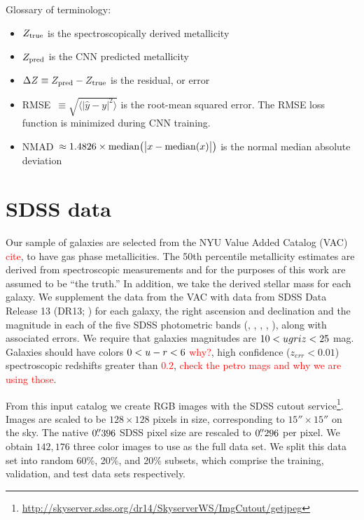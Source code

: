 \documentclass[fleqn,usenatbib]{mnras}
\newcommand{\editorial}[1]{\textcolor{red}{#1}}
\begin{document}
Glossary of terminology:
\begin{itemize}
	\item $Z_{\rm true}$ is the spectroscopically derived metallicity
	\item $Z_{\rm pred}$ is the CNN predicted metallicity
	\item $\Delta Z \equiv Z_{\rm pred} - Z_{\rm true}$ is the residual, or error
	\item RMSE~$\equiv \sqrt{\langle |\hat y - y|^2\rangle}$ is the root-mean squared error. 
	The RMSE loss function is minimized during CNN training.
	\item NMAD~$\approx 1.4826 \times {\rm median} \big (\big|x - {\rm median }(x) \big|\big )$ is the normal median absolute deviation
\end{itemize}


\section{SDSS data} \label{sec:data}

Our sample of galaxies are selected from the NYU Value Added Catalog (VAC) \editorial{cite}, to have gas phase metallicities. The 50th percentile metallicity estimates \citep{Tremonti2004} are derived from spectroscopic measurements and for the purposes of this work are assumed to be ``the truth.'' In addition, we take the derived stellar mass for each galaxy.
We supplement the data from the VAC with data from SDSS Data Release 13 (DR13; \citealt{Albareti2017}) for each galaxy, the right ascension and declination and the magnitude in each of the five SDSS photometric bands (\sdssu, \sdssg, \sdssr, \sdssi, \sdssz), along with associated errors. We require that galaxies magnitudes are $10 < \hbox{$u$}\hbox{$g$}\hbox{$r$}\hbox{$i$}\hbox{$z$} < 25$ mag. Galaxies should have colors $0 < \hbox{$u$}-\hbox{$r$} < 6$ \editorial{why?}, high confidence ($z_{err} < 0.01$) spectroscopic redshifts greater than \editorial{$0.2$}, \editorial{check the petro mags and why we are using those}.

From this input catalog we create RGB images with the SDSS cutout service\footnote{\url{http://skyserver.sdss.org/dr14/SkyserverWS/ImgCutout/getjpeg}}. Images are scaled to be $128\times128$ pixels in size, corresponding to $15''\times15''$ on the sky. The native $0\hbox{$.\!\!^{\prime\prime}$}396$ SDSS pixel size are rescaled to $0\hbox{$.\!\!^{\prime\prime}$}296$ per pixel.
We obtain $142,176$ three color images to use as the full data set.
We split this data set into random 60\%, 20\%, and 20\% subsets, which comprise the training, validation, and test data sets respectively.
\end{document}
